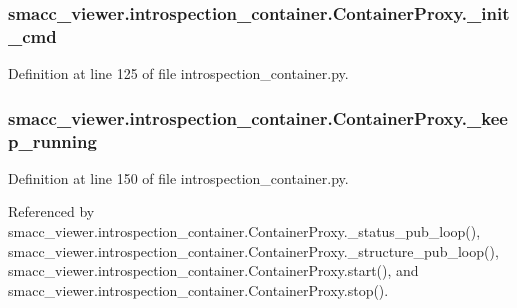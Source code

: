 \subsubsection[{\texorpdfstring{\+\_\+init\+\_\+cmd}{_init_cmd}}]{\setlength{\rightskip}{0pt plus 5cm}smacc\+\_\+viewer.\+introspection\+\_\+container.\+Container\+Proxy.\+\_\+init\+\_\+cmd\hspace{0.3cm}{\ttfamily [private]}}\hypertarget{classsmacc__viewer_1_1introspection__container_1_1ContainerProxy_a32df154fd0035346ac0ba4032f67e73e}{}\label{classsmacc__viewer_1_1introspection__container_1_1ContainerProxy_a32df154fd0035346ac0ba4032f67e73e}


Definition at line 125 of file introspection\+\_\+container.\+py.

\subsubsection[{\texorpdfstring{\+\_\+keep\+\_\+running}{_keep_running}}]{\setlength{\rightskip}{0pt plus 5cm}smacc\+\_\+viewer.\+introspection\+\_\+container.\+Container\+Proxy.\+\_\+keep\+\_\+running\hspace{0.3cm}{\ttfamily [private]}}\hypertarget{classsmacc__viewer_1_1introspection__container_1_1ContainerProxy_ae4526126fccd31f57df2e44b04de8517}{}\label{classsmacc__viewer_1_1introspection__container_1_1ContainerProxy_ae4526126fccd31f57df2e44b04de8517}


Definition at line 150 of file introspection\+\_\+container.\+py.



Referenced by smacc\+\_\+viewer.\+introspection\+\_\+container.\+Container\+Proxy.\+\_\+status\+\_\+pub\+\_\+loop(), smacc\+\_\+viewer.\+introspection\+\_\+container.\+Container\+Proxy.\+\_\+structure\+\_\+pub\+\_\+loop(), smacc\+\_\+viewer.\+introspection\+\_\+container.\+Container\+Proxy.\+start(), and smacc\+\_\+viewer.\+introspection\+\_\+container.\+Container\+Proxy.\+stop().

